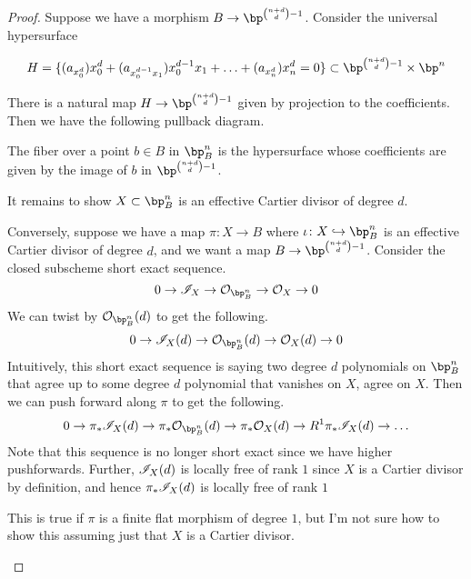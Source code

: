\documentclass[12pt]{article}
\begin{document}
\begin{proof}
  Suppose we have a morphism $B \to \bp^{\binom{n+d}{d} - 1}$. Consider the universal hypersurface
  
  \[H = \{(a_{x_0^d}) x_0^d + (a_{x_0^{d-1}x_1}) x_0^{d-1}x_1 + \ldots + (a_{x_n^d})x_n^d = 0\} \subset \bp^{\binom{n+d}{d} - 1} \times \bp^n\]
  
  There is a natural map $H \to \bp^{\binom{n+d}{d} - 1}$ given by projection to the coefficients. Then we have the following pullback diagram.
  \begin{figure}[H]
      \centering
  \end{figure}
  
  The fiber over a point $b \in B$ in $\bp^n_B$ is the hypersurface whose coefficients are given by the image of $b$ in $\bp^{\binom{n+d}{d}-1}$. 

  \begin{todo}
      It remains to show $X \subset \bp^n_B$ is an effective Cartier divisor of degree $d$.
  \end{todo}

  Conversely, suppose we have a map $\pi \colon X \to B$ where $\iota \colon X \hookrightarrow \bp^n_B$ is an effective Cartier divisor of degree $d$, and we want a map $B \to \bp^{\binom{n+d}{d} - 1}$. Consider the closed subscheme short exact sequence.
  \[0 \to \fani_X \to \calo_{\bp^n_B} \to \calo_X \to 0\]
  We can twist by $\calo_{\bp^n_B}(d)$ to get the following.
  \[0 \to \fani_X(d) \to \calo_{\bp^n_B}(d) \to  \calo_X(d) \to 0\]
  Intuitively, this short exact sequence is saying two degree $d$ polynomials on $\bp^n_B$ that agree up to some degree $d$ polynomial that vanishes on $X$, agree on $X$. Then we can push forward along $\pi$ to get the following.
  \[0 \to \pi_* \fani_X(d) \to \pi_* \calo_{\bp^n_B}(d) \to \pi_* \calo_X(d) \to R^1 \pi_* \fani_X(d) \to \ldots\]
  Note that this sequence is no longer short exact since we have higher pushforwards. Further, $\mathscr{I}_X(d)$ is locally free of rank $1$ since $X$ is a Cartier divisor by definition, and hence $\pi_* \mathscr{I}_X(d)$ is locally free of rank $1$

  \begin{todo}
      This is true if $\pi$ is a finite flat morphism of degree $1$, but I'm not sure how to show this assuming just that $X$ is a Cartier divisor.
  \end{todo}
  

\end{proof}
\end{document}
